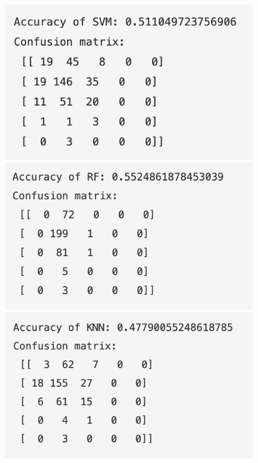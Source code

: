 \documentclass{article}
\begin{document}
\begin{figure}[htbp]
	\parbox{0.3\linewidth}{
        \centering
		\includegraphics[width=\linewidth]{images/svm.png}
        \caption{}
        \label{fig:svm}
	}
	\hfill
	\parbox{0.3\linewidth}{\centering
		\includegraphics[width=\linewidth]{images/rf.png}
        \caption{}
	}
    \hfill
    \parbox{0.3\linewidth}{\centering
		\includegraphics[width=\linewidth]{images/knn.png}
        \caption{}
        \label{fig:knn}
	}
\end{figure}
\end{document}
